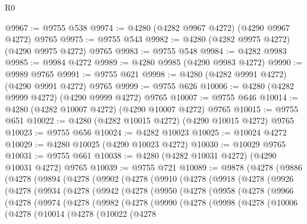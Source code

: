 \begin{lexlean}{R0}
\begin{coremodule}
@9967 := @9755 @538
@9974 := @4280 (@4282 @9967 @4272) (@4290 @9967 @4272) @9765
@9975 := @9755 @543
@9982 := @4280 (@4282 @9975 @4272) (@4290 @9975 @4272) @9765
@9983 := @9755 @548
@9984 := @4282 @9983
@9985 := @9984 @4272
@9989 := @4280 @9985 (@4290 @9983 @4272)
@9990 := @9989 @9765
@9991 := @9755 @621
@9998 := @4280 (@4282 @9991 @4272) (@4290 @9991 @4272) @9765
@9999 := @9755 @626
@10006 := @4280 (@4282 @9999 @4272) (@4290 @9999 @4272) @9765
@10007 := @9755 @646
@10014 := @4280 (@4282 @10007 @4272) (@4290 @10007 @4272) @9765
@10015 := @9755 @651
@10022 := @4280 (@4282 @10015 @4272) (@4290 @10015 @4272) @9765
@10023 := @9755 @656
@10024 := @4282 @10023
@10025 := @10024 @4272
@10029 := @4280 @10025 (@4290 @10023 @4272)
@10030 := @10029 @9765
@10031 := @9755 @661
@10038 := @4280 (@4282 @10031 @4272) (@4290 @10031 @4272) @9765
@10039 := @9755 @721
@10089 := @9878
    (@4278
      (@9886
        (@4278
          (@9894
            (@4278
              (@9902
                (@4278
                  (@9910
                    (@4278
                      (@9918
                        (@4278
                          (@9926
                            (@4278
                              (@9934
                                (@4278
                                  (@9942
                                    (@4278
                                      (@9950
                                        (@4278
                                          (@9958
                                            (@4278
                                              (@9966
                                                (@4278
                                                  (@9974
                                                    (@4278
                                                      (@9982
                                                        (@4278
                                                          (@9990
                                                            (@4278
                                                              (@9998
                                                                (@4278
                                                                  (@10006
                                                                    (@4278
                                                                      (@10014
                                                                        (@4278
                                                                          (@10022
                                                                            (@4278

\end{coremodule}
\end{lexlean}
